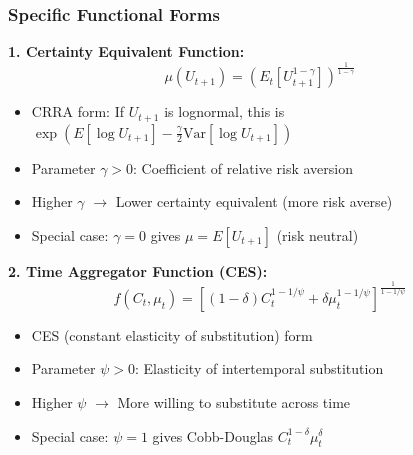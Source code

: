 \documentclass{beamer}
\begin{document}
\begin{frame}
    \frametitle{Specific Functional Forms}
    
    \textbf{1. Certainty Equivalent Function:}
    \begin{equation*}
        \mu(U_{t+1}) = \left( E_t[U_{t+1}^{1-\gamma}] \right)^{\frac{1}{1-\gamma}}
    \end{equation*}
    
    \begin{itemize}
        \item CRRA form: If $U_{t+1}$ is lognormal, this is $\exp(E[\log U_{t+1}] - \frac{\gamma}{2}\text{Var}[\log U_{t+1}])$
        \item Parameter $\gamma > 0$: Coefficient of relative risk aversion
        \item Higher $\gamma$ $\rightarrow$ Lower certainty equivalent (more risk averse)
        \item Special case: $\gamma = 0$ gives $\mu = E[U_{t+1}]$ (risk neutral)
    \end{itemize}
    
    
    \textbf{2. Time Aggregator Function (CES):}
    \begin{equation*}
        f(C_t, \mu_t) = \left[ (1-\delta)C_t^{1-1/\psi} + \delta \mu_t^{1-1/\psi} \right]^{\frac{1}{1-1/\psi}}
    \end{equation*}
    
    \begin{itemize}
        \item CES (constant elasticity of substitution) form
        \item Parameter $\psi > 0$: Elasticity of intertemporal substitution
        \item Higher $\psi$ $\rightarrow$ More willing to substitute across time
        \item Special case: $\psi = 1$ gives Cobb-Douglas $C_t^{1-\delta} \mu_t^{\delta}$
    \end{itemize}
    
\end{frame}
\end{document}
